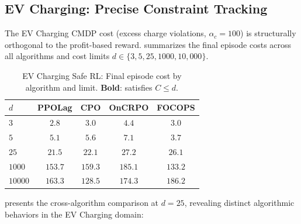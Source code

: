 \subsection{EV Charging: Precise Constraint Tracking}
\label{sec:saferl_ev}

The EV Charging CMDP cost (excess charge violations, $\alpha_c = 100$) is structurally orthogonal to the profit-based reward.  summarizes the final episode costs across all algorithms and cost limits $d \in \{3, 5, 25, 1000, 10{,}000\}$.

\begin{table}[htbp]
\centering
\caption{EV Charging Safe RL: Final episode cost by algorithm and limit. \textbf{Bold}: satisfies $C \leq d$.}
\label{tab:ev_saferl}
\begin{tabular}{@{}lcccc@{}}
\toprule
\textbf{$d$} & \textbf{PPOLag} & \textbf{CPO} & \textbf{OnCRPO} & \textbf{FOCOPS} \\
\midrule
$3$      & $\mathbf{2.8}$   & $3.0$            & $4.4$   & $\mathbf{3.0}$ \\
$5$      & $\mathbf{5.1}$   & $\mathbf{5.6}$   & $7.1$   & $\mathbf{3.7}$ \\
$25$     & $\mathbf{21.5}$  & $\mathbf{22.1}$  & $27.2$  & $26.1$ \\
$1000$   & $\mathbf{153.7}$ & $\mathbf{159.3}$ & $\mathbf{185.1}$ & $\mathbf{133.2}$ \\
$10000$  & $\mathbf{163.3}$ & $\mathbf{128.5}$ & $\mathbf{174.3}$ & $\mathbf{186.2}$ \\
\bottomrule
\end{tabular}
\end{table}

 presents the cross-algorithm comparison at $d = 25$, revealing distinct algorithmic behaviors in the EV Charging domain:

